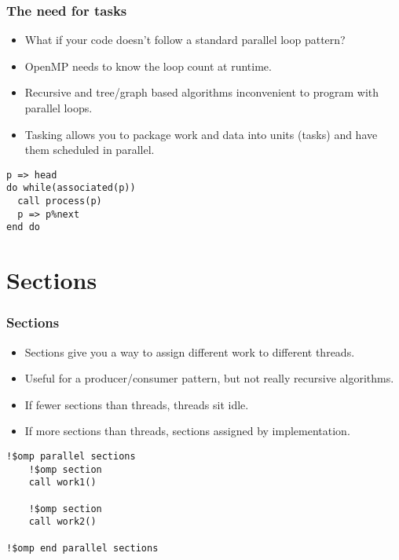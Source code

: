 \documentclass{beamer}
\begin{document}
\begin{frame}[fragile]
\frametitle{The need for tasks}
\begin{itemize}
  \item What if your code doesn't follow a standard parallel loop pattern?
  \item OpenMP needs to know the loop count at runtime.
  \item Recursive and tree/graph based algorithms inconvenient to program with parallel loops.
  \item Tasking allows you to package work and data into units (tasks) and have them scheduled in parallel.
\end{itemize}

\begin{verbatim}
p => head
do while(associated(p))
  call process(p)
  p => p%next
end do
\end{verbatim}
\end{frame}
\section{Sections}
\begin{frame}[fragile]
\frametitle{Sections}
\begin{itemize}
  \item Sections give you a way to assign different work to different threads.
  \item Useful for a producer/consumer pattern, but not really recursive algorithms.
  \item If fewer sections than threads, threads sit idle.
  \item If more sections than threads, sections assigned by implementation.
\end{itemize}

\begin{verbatim}
!$omp parallel sections
    !$omp section
    call work1()

    !$omp section
    call work2()

!$omp end parallel sections
\end{verbatim}
\end{frame}

\end{document}
